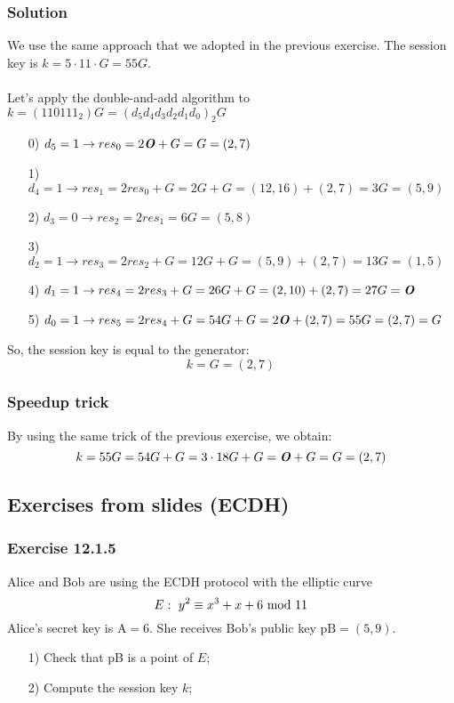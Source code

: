 \subsubsection*{Solution}
We use the same approach that we adopted in the previous exercise. The session key is $k=5\cdot11\cdot G=55G$.\\\\
Let's apply the double-and-add algorithm to $k=(110111_2)G=(d_5d_4d_3d_2d_1d_0)_2G$
\begin{enumerate}
    \item[0)] $d_5=1\rightarrow res_0=2\text{\textbf{\textit{O}}}+G=G=(2,7)$
    \item[1)] $d_4=1\rightarrow res_1=2res_0+G=2G+G=(12,16)+(2,7)=3G=(5,9)$
    \item[2)] $d_3=0\rightarrow res_2=2res_1=6G=(5,8)$
    \item[3)] $d_2=1\rightarrow res_3=2res_2+G=12G+G=(5,9)+(2,7)=13G=(1,5)$
    \item[4)] $d_1=1\rightarrow res_4=2res_3+G=26G+G=(2,10)+(2,7)=27G=\text{\textbf{\textit{O}}}$
    \item[5)] $d_0=1\rightarrow res_5=2res_4+G=54G+G=2\text{\textbf{\textit{O}}}+(2,7)=55G=(2,7)=G$
\end{enumerate}
So, the session key is equal to the generator:
$$k=G=(2,7)$$

\subsubsection*{Speedup trick}
By using the same trick of the previous exercise, we obtain:
$$k=55G=54G+G=3\cdot18G+G=\text{\textbf{\textit{O}}}+G=G=(2,7)$$

\newpage
\subsection{Exercises from slides (ECDH)}
\subsubsection{Exercise 12.1.5}
Alice and Bob are using the ECDH protocol with the elliptic curve
$$E:\ y^2\equiv x^3+x+6\text{ mod }11$$
Alice's secret key is $\text{A}=6$. She receives Bob's public key $\text{pB}=(5,9)$.
\begin{itemize}
    \item[1)] Check that pB is a point of $E$;
    \item[2)] Compute the session key $k$;
\end{itemize}

